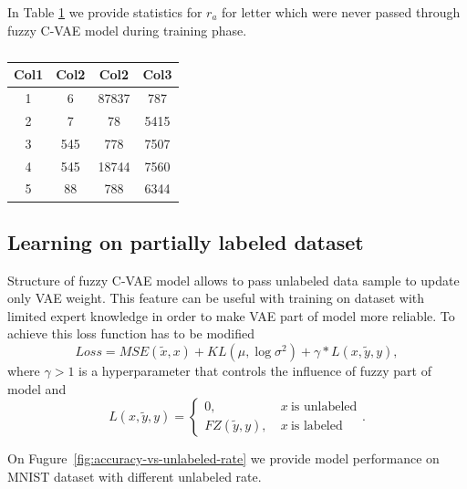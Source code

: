 \documentclass[runningheads]{llncs}
\begin{document}
In Table \ref{table-anomaly} we provide statistics for $r_{a}$ for letter which were never passed through fuzzy C-VAE model during training phase.

\begin{table}[h!]
    \centering
    \begin{tabular}{||c c c c||} 
     \hline
     Col1 & Col2 & Col2 & Col3 \\ [0.5ex] 
     \hline\hline
     1 & 6 & 87837 & 787 \\ 
     2 & 7 & 78 & 5415 \\
     3 & 545 & 778 & 7507 \\
     4 & 545 & 18744 & 7560 \\
     5 & 88 & 788 & 6344 \\ [1ex] 
     \hline
    \end{tabular}
    \caption{}
    \label{table-anomaly}
\end{table}

\subsection{Learning on partially labeled dataset}

Structure of fuzzy C-VAE model allows to pass unlabeled data sample to update only VAE weight.
This feature can be useful with training on dataset with limited expert knowledge in order to make VAE part of model more reliable.
To achieve this loss function has to be modified
\[
    Loss = MSE(\tilde{x}, x) + KL(\mu, \log{\sigma^2}) + \gamma * L(x, \tilde{y}, y),
\]
where $\gamma > 1$ is a hyperparameter that controls the influence of fuzzy part of model and
\[
    L(x, \tilde{y}, y) = \begin{cases}
        0,&~x~\mbox{is~unlabeled}\\
        FZ(\tilde{y}, y),&~x~\mbox{is~labeled}
      \end{cases}.
\]

On Fugure~\ref{fig:accuracy-vs-unlabeled-rate} we provide model performance on MNIST dataset with different unlabeled rate.
\end{document}
